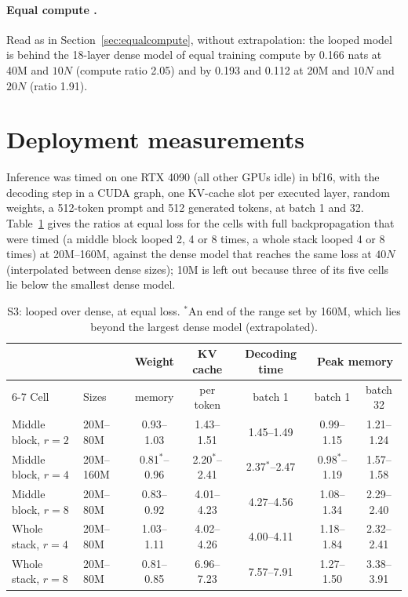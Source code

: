 \paragraph{Equal compute .} Read as in Section~\ref{sec:equalcompute}, without extrapolation: the
looped model is behind the 18-layer dense model of equal training compute by 0.166 nats at 40M and $10N$ (compute ratio
2.05) and by 0.193 and 0.112 at 20M and $10N$ and $20N$ (ratio 1.91).

\section{Deployment measurements}
\label{app:cost}

Inference was timed on one RTX 4090 (all other GPUs idle) in bf16, with the decoding step in a CUDA graph, one KV-cache
slot per executed layer, random weights, a 512-token prompt and 512 generated tokens, at batch 1 and 32. Table~\ref{tab:s3} gives the ratios at
equal loss for the cells with full backpropagation that were timed (a middle block looped 2, 4 or 8 times, a whole stack
looped 4 or 8 times) at 20M--160M, against the dense model that reaches the same loss at $40N$ (interpolated between dense
sizes); 10M is left out because three of its five cells lie below the smallest dense model.

\begin{table}[h]
  \centering
  \caption{S3: looped over dense, at equal loss. $^{*}$An end of the range set by 160M, which lies beyond the largest dense
  model (extrapolated).}
  \label{tab:s3}
  \footnotesize
  \setlength{\tabcolsep}{4pt}
  \begin{tabular}{llccccc}
    \toprule
    & & Weight & KV cache & Decoding time & \multicolumn{2}{c}{Peak memory} \\
    \cmidrule(lr){6-7}
    Cell & Sizes & memory & per token & batch 1 & batch 1 & batch 32 \\
    \midrule
    Middle block, $r=2$ & 20M--80M  & 0.93--1.03 & 1.43--1.51 & 1.45--1.49 & 0.99--1.15 & 1.21--1.24 \\
    Middle block, $r=4$ & 20M--160M & 0.81$^{*}$--0.96 & 2.20$^{*}$--2.41 & 2.37$^{*}$--2.47 & 0.98$^{*}$--1.19 & 1.57--1.58 \\
    Middle block, $r=8$ & 20M--80M  & 0.83--0.92 & 4.01--4.23 & 4.27--4.56 & 1.08--1.34 & 2.29--2.40 \\
    Whole stack, $r=4$  & 20M--80M  & 1.03--1.11 & 4.02--4.26 & 4.00--4.11 & 1.18--1.84 & 2.32--2.41 \\
    Whole stack, $r=8$  & 20M--80M  & 0.81--0.85 & 6.96--7.23 & 7.57--7.91 & 1.27--1.50 & 3.38--3.91 \\
    \bottomrule
  \end{tabular}
\end{table}

